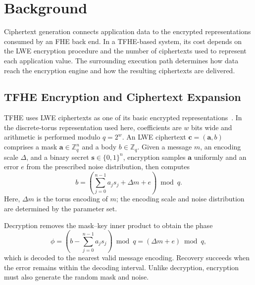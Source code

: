 \begingroup
\setlength{\emergencystretch}{1em}
\section{Background}
\label{sec:background}

Ciphertext generation connects application data to the encrypted representations consumed by an FHE back end. In a TFHE-based system, its cost depends on the LWE encryption procedure and the number of ciphertexts used to represent each application value. The surrounding execution path determines how data reach the encryption engine and how the resulting ciphertexts are delivered.

\subsection{TFHE Encryption and Ciphertext Expansion}
\label{subsec:lwe-background}

TFHE uses LWE ciphertexts as one of its basic encrypted representations~\cite{tfhe}. In the discrete-torus representation used here, coefficients are $w$ bits wide and arithmetic is performed modulo $q=2^w$. An LWE ciphertext $\mathbf{c}=(\mathbf{a},b)$ comprises a mask $\mathbf{a}\in\mathbb{Z}_q^n$ and a body $b\in\mathbb{Z}_q$. Given a message $m$, an encoding scale $\Delta$, and a binary secret $\mathbf{s}\in\{0,1\}^n$, encryption samples $\mathbf{a}$ uniformly and an error $e$ from the prescribed noise distribution, then computes
\begin{equation}
b=\left(\sum_{j=0}^{n-1}a_js_j+\Delta m+e\right)\bmod q.
\label{eq:lwe-encryption}
\end{equation}
Here, $\Delta m$ is the torus encoding of $m$; the encoding scale and noise distribution are determined by the parameter set.

Decryption removes the mask--key inner product to obtain the phase
\begin{equation}
\phi=\left(b-\sum_{j=0}^{n-1}a_js_j\right)\bmod q
     =(\Delta m+e)\bmod q,
\label{eq:lwe-decryption}
\end{equation}
which is decoded to the nearest valid message encoding. Recovery succeeds when the error remains within the decoding interval. Unlike decryption, encryption must also generate the random mask and noise.

